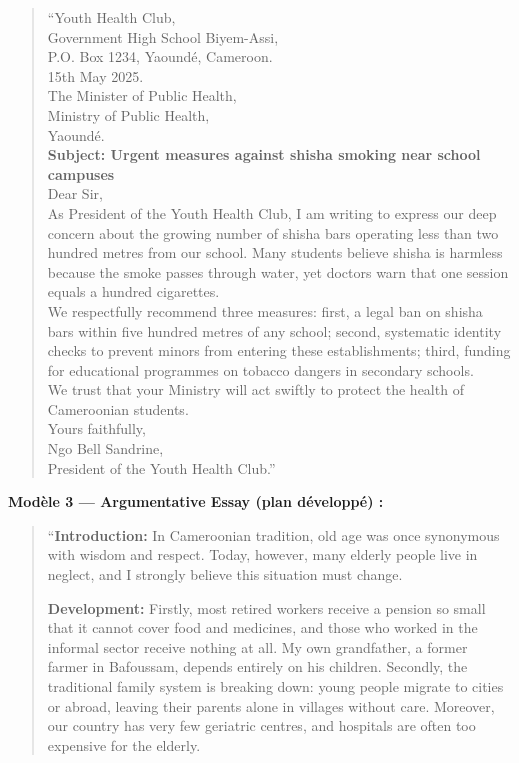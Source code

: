 \documentclass[11pt]{article}
\begin{document}
\begin{corrige}
\begin{quote}
“Youth Health Club,\\
Government High School Biyem-Assi,\\
P.O. Box 1234, Yaoundé, Cameroon.\\
15th May 2025.\\[4pt]
The Minister of Public Health,\\
Ministry of Public Health,\\
Yaoundé.\\[4pt]
\textbf{Subject: Urgent measures against shisha smoking near school campuses}\\[4pt]
Dear Sir,\\[4pt]
As President of the Youth Health Club, I am writing to express our deep concern about the growing number of shisha bars operating less than two hundred metres from our school. Many students believe shisha is harmless because the smoke passes through water, yet doctors warn that one session equals a hundred cigarettes.\\[4pt]
We respectfully recommend three measures: first, a legal ban on shisha bars within five hundred metres of any school; second, systematic identity checks to prevent minors from entering these establishments; third, funding for educational programmes on tobacco dangers in secondary schools.\\[4pt]
We trust that your Ministry will act swiftly to protect the health of Cameroonian students.\\[4pt]
Yours faithfully,\\[4pt]
Ngo Bell Sandrine,\\
President of the Youth Health Club.”
\end{quote}

\textbf{Modèle 3 — Argumentative Essay (plan développé) :}

\begin{quote}
“\textbf{Introduction:} In Cameroonian tradition, old age was once synonymous with wisdom and respect. Today, however, many elderly people live in neglect, and I strongly believe this situation must change.

\textbf{Development:} Firstly, most retired workers receive a pension so small that it cannot cover food and medicines, and those who worked in the informal sector receive nothing at all. My own grandfather, a former farmer in Bafoussam, depends entirely on his children. Secondly, the traditional family system is breaking down: young people migrate to cities or abroad, leaving their parents alone in villages without care. Moreover, our country has very few geriatric centres, and hospitals are often too expensive for the elderly.


\end{quote}
\end{corrige}
\end{document}
